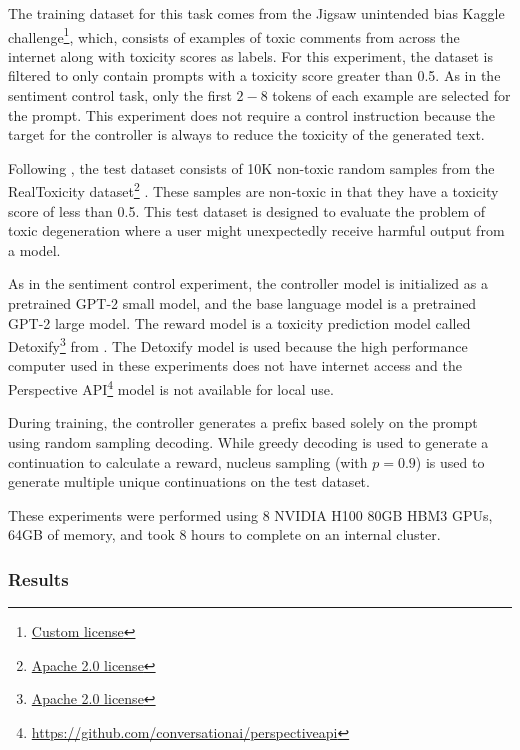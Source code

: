 \documentclass[phd,electronic,oneside,twosidetoc,letterpaper,chaptercenter,parttop,lof]{byumsphd}
\begin{document}
The training dataset for this task comes from the Jigsaw unintended bias Kaggle challenge\footnote{\href{https://www.kaggle.com/competitions/jigsaw-unintended-bias-in-toxicity-classification/rules}{Custom license}}, which, consists of examples of toxic comments from across the internet along with toxicity scores as labels. 
For this experiment, the dataset is filtered to only contain prompts with a toxicity score greater than 0.5. 
As in the sentiment control task, only the first $2-8$ tokens of each example are selected for the prompt. 
This experiment does not require a control instruction because the target for the controller is always to reduce the toxicity of the generated text.

Following \citet{liu2021dexpert}, the test dataset consists of 10K non-toxic random samples from the RealToxicity dataset\footnote{\href{https://huggingface.co/datasets/allenai/real-toxicity-prompts}{Apache 2.0 license}} \cite{gehman2020toxicity}. 
These samples are non-toxic in that they have a toxicity score of less than 0.5.
This test dataset is designed to evaluate the problem of toxic degeneration \citep{sheng2019bias} where a user might unexpectedly receive harmful output from a model.

As in the sentiment control experiment, the controller model is initialized as a pretrained GPT-2 small model, and the base language model is a pretrained GPT-2 large model. 
The reward model is a toxicity prediction model called Detoxify\footnote{\href{https://github.com/unitaryai/detoxify/blob/master/LICENSE}{Apache 2.0 license}} from \citet{hanu2020detoxify}. 
The Detoxify model is used because the high performance computer used in these experiments does not have internet access and the Perspective API\footnote{\href{https://github.com/conversationai/perspectiveapi}{https://github.com/conversationai/perspectiveapi}} model is not available for local use. 

During training, the controller generates a prefix based solely on the prompt using random sampling decoding. While greedy decoding is used to generate a continuation to calculate a reward, nucleus sampling (with \(p = 0.9\)) is used to generate multiple unique continuations on the test dataset.

These experiments were performed using 8 NVIDIA H100 80GB HBM3 GPUs, 64GB of memory, and took 8 hours to complete on an internal cluster.

\subsubsection{Results}
\end{document}

